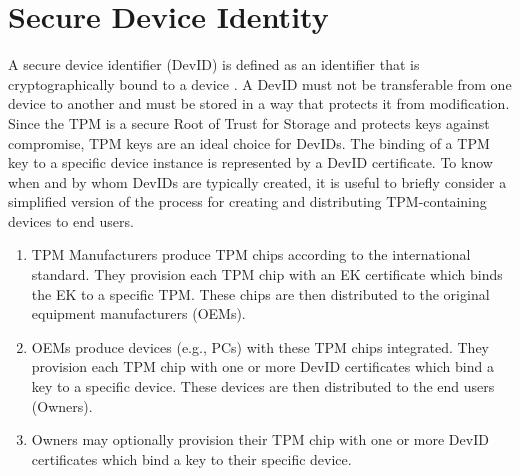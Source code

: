 \chapter{Secure Device Identity}


A secure device identifier (DevID) is defined as an identifier that is cryptographically bound to a device \cite{DevIDSpec-IEEE}. A DevID must not be transferable from one device to another and must be stored in a way that protects it from modification. Since the TPM is a secure Root of Trust for Storage and protects keys against compromise, TPM keys are an ideal choice for DevIDs. 
The binding of a TPM key to a specific device instance is represented by a DevID certificate.
To know when and by whom DevIDs are typically created, it is useful to briefly consider a simplified version of the process for creating and distributing TPM-containing devices to end users.
\begin{enumerate}
  \item\label{ite:idTPM} TPM Manufacturers produce TPM chips according to the international standard. They provision each TPM chip with an EK certificate which binds the EK to a specific TPM. These chips are then distributed to the original equipment manufacturers (OEMs).
  \item\label{ite:idDevIni} OEMs produce devices (e.g., PCs) with these TPM chips integrated. They provision each TPM chip with one or more DevID certificates which bind a key to a specific device. These devices are then distributed to the end users (Owners).
  \item\label{ite:idDevLoc} Owners may optionally provision their TPM chip with one or more DevID certificates which bind a key to their specific device.
\end{enumerate} 

